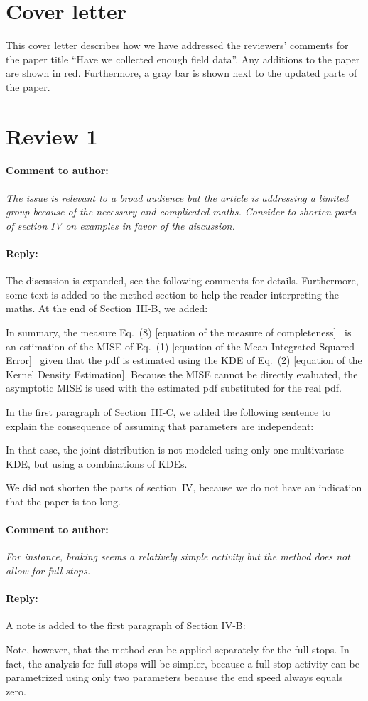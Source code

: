 \documentclass[10pt,final,a4paper,oneside,onecolumn]{article}
\newcommand{\toauthor}{\paragraph*{Comment to author:} \itshape}
\newcommand{\fromauthor}{\paragraph*{Reply:} \normalfont}
\newcommand{\cstart}{\color{red}}
\newcommand{\cend}{\color{black}}
\newcommand{\additionend}[1]{\color{black}[#1]\color{red}}
\newcommand{\addition}[1]{\additionend{#1}\ }
\begin{document}
	
\section*{Cover letter}

This cover letter describes how we have addressed the reviewers' comments for the paper title ``Have we collected enough field data''. Any additions to the paper are shown in \color{red}red\color{black}. Furthermore, a gray bar is shown next to the updated parts of the paper.
	
\section*{Review 1}

\toauthor The issue is relevant to a broad audience but the article is addressing a limited group because of the necessary and complicated maths. Consider to shorten parts of section IV on examples in favor of the discussion. 

\fromauthor The discussion is expanded, see the following comments for details. Furthermore, some text is added to the method section to help the reader interpreting the maths. At the end of Section~III-B, we added:

\cstart
In summary, the measure Eq.\ (8) \addition{equation of the measure of completeness} is an estimation of the MISE of Eq.\ (1) \addition{equation of the Mean Integrated Squared Error} given that the pdf is estimated using the KDE of Eq.\ (2) \additionend{equation of the Kernel Density Estimation}. Because the MISE cannot be directly evaluated, the asymptotic MISE is used with the estimated pdf substituted for the real pdf. 
\cend

In the first paragraph of Section~III-C, we added the following sentence to explain the consequence of assuming that parameters are independent:

\cstart
In that case, the joint distribution is not modeled using only one multivariate KDE, but using a combinations of KDEs.
\cend

We did not shorten the parts of section~IV, because we do not have an indication that the paper is too long.

\toauthor For instance, braking seems a relatively simple activity but the method does not allow for full stops.

\fromauthor A note is added to the first paragraph of Section IV-B:

\cstart
Note, however, that the method can be applied separately for the full stops. In fact, the analysis for full stops will be simpler, because a full stop activity can be parametrized using only two parameters because the end speed always equals zero. 
\cend
\end{document}
